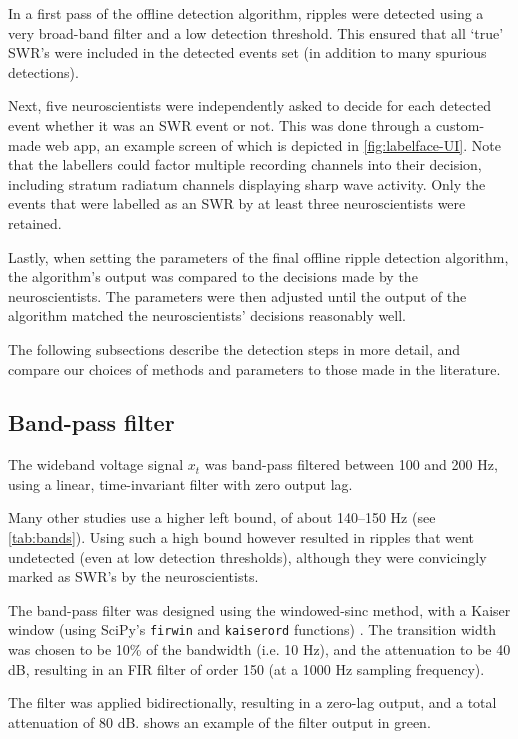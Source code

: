 In a first pass of the offline detection algorithm, ripples were detected using a very broad-band filter and a low detection threshold. This ensured that all `true' SWR's were included in the detected events set (in addition to many spurious detections).

Next, five neuroscientists were independently asked to decide for each detected event whether it was an SWR event or not. This was done through a custom-made web app, an example screen of which is depicted in \cref{fig:labelface-UI}. Note that the labellers could factor multiple recording channels into their decision, including stratum radiatum channels displaying sharp wave activity. Only the events that were labelled as an SWR by at least three neuroscientists were retained.

Lastly, when setting the parameters of the final offline ripple detection algorithm, the algorithm's output was compared to the decisions made by the neuroscientists. The parameters were then adjusted until the output of the algorithm matched the neuroscientists' decisions reasonably well.

The following subsections describe the detection steps in more detail, and compare our choices of methods and parameters to those made in the literature.


\subsection{Band-pass filter}

The wideband voltage signal $x_t$ was band-pass filtered between 100 and 200 Hz, using a linear, time-invariant filter with zero output lag.

Many other studies use a higher left bound, of about 140--150 Hz (see \cref{tab:bands}). Using such a high bound however resulted in ripples that went undetected (even at low detection thresholds), although they were convicingly marked as SWR's by the neuroscientists.

The band-pass filter was designed using the windowed-sinc method, with a Kaiser window (using SciPy's \texttt{firwin} and \texttt{kaiserord} functions) \cite{Roelandts2016,Jones2018a}. The transition width was chosen to be 10\% of the bandwidth (i.e. 10 Hz), and the attenuation to be 40 dB, resulting in an FIR filter of order 150 (at a 1000 Hz sampling frequency).

The filter was applied bidirectionally, resulting in a zero-lag output, and a total attenuation of 80 dB.  shows an example of the filter output in green.

